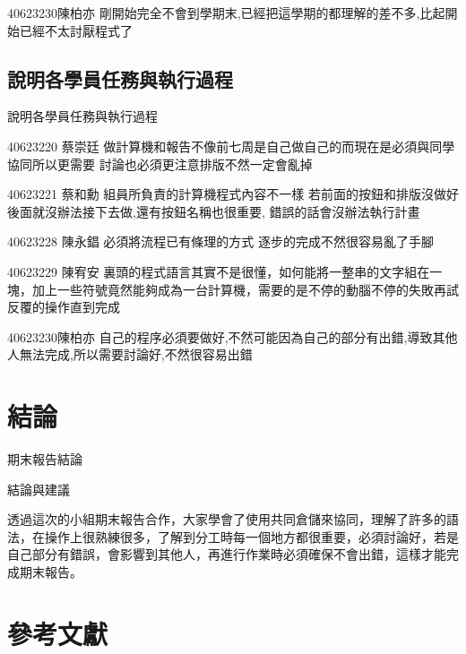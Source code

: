\documentclass[12pt,,]{report}
\begin{document}
40623230陳柏亦
剛開始完全不會到學期末,已經把這學期的都理解的差不多,比起開始已經不太討厭程式了

\hypertarget{ux8aaaux660eux5404ux5b78ux54e1ux4efbux52d9ux8207ux57f7ux884cux904eux7a0b}{%
\section{說明各學員任務與執行過程}\label{ux8aaaux660eux5404ux5b78ux54e1ux4efbux52d9ux8207ux57f7ux884cux904eux7a0b}}

說明各學員任務與執行過程

40623220 蔡崇廷
做計算機和報告不像前七周是自己做自己的而現在是必須與同學協同所以更需要
討論也必須更注意排版不然一定會亂掉

40623221 蔡和勳 組員所負責的計算機程式內容不一樣
若前面的按鈕和排版沒做好後面就沒辦法接下去做,還有按鈕名稱也很重要,
錯誤的話會沒辦法執行計畫

40623228 陳永錩 必須將流程已有條理的方式 逐步的完成不然很容易亂了手腳

40623229 陳宥安
裏頭的程式語言其實不是很懂，如何能將一整串的文字組在一塊，加上一些符號竟然能夠成為一台計算機，需要的是不停的動腦不停的失敗再試反覆的操作直到完成

40623230陳柏亦
自己的程序必須要做好,不然可能因為自己的部分有出錯,導致其他人無法完成,所以需要討論好,不然很容易出錯

\hypertarget{ux7d50ux8ad6}{%
\chapter{結論}\label{ux7d50ux8ad6}}

期末報告結論

結論與建議

透過這次的小組期末報告合作，大家學會了使用共同倉儲來協同，理解了許多的語法，在操作上很熟練很多，了解到分工時每一個地方都很重要，必須討論好，若是自己部分有錯誤，會影響到其他人，再進行作業時必須確保不會出錯，這樣才能完成期末報告。

\hypertarget{ux53c3ux8003ux6587ux737b}{%
\chapter{參考文獻}\label{ux53c3ux8003ux6587ux737b}}
\end{document}
